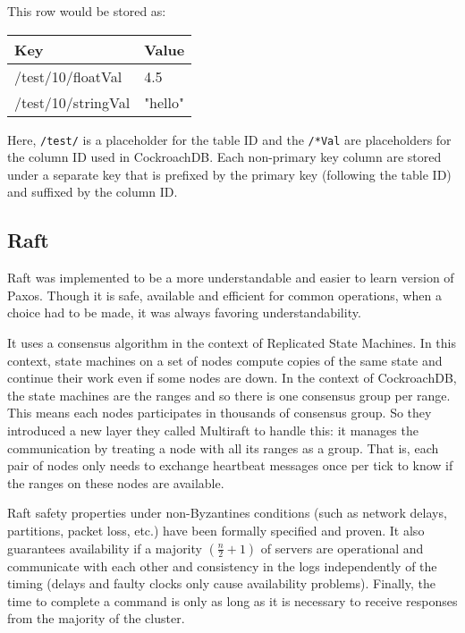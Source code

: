 This row would be stored as:

\begin{center}
\begin{tabular}{|l|l|}
\hline
Key & Value\\
\hline
/test/10/floatVal & 4.5\\
/test/10/stringVal & "hello"\\
\hline
\end{tabular}
\end{center}

Here, \verb~/test/~ is a placeholder for the table ID and the \verb~/*Val~ are placeholders for the column ID used in CockroachDB. Each non-primary key column are stored under a separate key that is prefixed by the primary key (following the table ID) and suffixed by the column ID.

\subsection{Raft}

Raft was implemented to be a more understandable and easier to learn version of Paxos\cite{DBLP:conf/usenix/OngaroO14}. Though it is safe, available and efficient for common operations, when a choice had to be made, it was always favoring understandability.


It uses a consensus algorithm in the context of Replicated State Machines. In this context, state machines on a set of nodes compute copies of the same state and continue their work even if some nodes are down. In the context of CockroachDB, the state machines are the ranges and so there is one consensus group per range. This means each nodes participates in thousands of consensus group. So they introduced a new layer they called Multiraft to handle this: it manages the communication by treating a node with all its ranges as a group. That is, each pair of nodes only needs to exchange heartbeat messages once per tick to know if the ranges on these nodes are available\cite{CRDB:multiraft}.

Raft safety properties under non-Byzantines conditions (such as network delays, partitions, packet loss, etc.) have been formally specified and proven. It also guarantees availability if a majority $(\frac{n}{2} + 1)$ of servers are operational and communicate with each other and consistency in the logs independently of the timing (delays and faulty clocks only cause availability problems). Finally, the time to complete a command is only as long as it is necessary to receive responses from the majority of the cluster.

